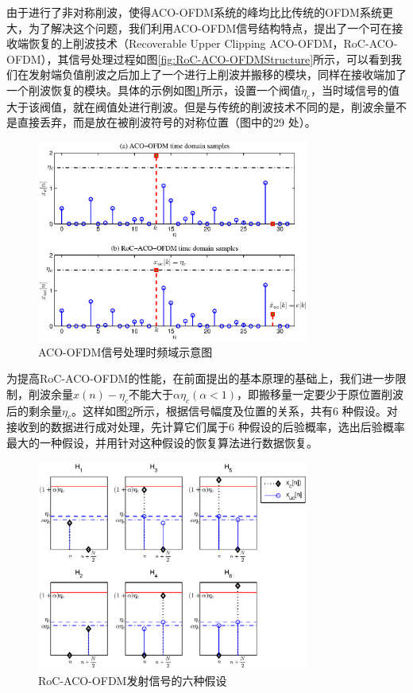 由于进行了非对称削波，使得ACO-OFDM系统的峰均比比传统的OFDM系统更大，为了解决这个问题，我们利用ACO-OFDM信号结构特点，提出了一个可在接收端恢复的上削波技术（Recoverable Upper Clipping ACO-OFDM，RoC-ACO-OFDM）\cite{xu2014aco}，其信号处理过程如图\ref{fig:RoC-ACO-OFDMStructure}所示，可以看到我们在发射端负值削波之后加上了一个进行上削波并搬移的模块，同样在接收端加了一个削波恢复的模块。具体的示例如图\ref{fig:SCH_data}所示，设置一个阀值$\eta_c$，当时域信号的值大于该阀值，就在阀值处进行削波。但是与传统的削波技术不同的是，削波余量不是直接丢弃，而是放在被削波符号的对称位置（图中的29 处）。
\begin{figure}[htbp]
    \centering
    \includegraphics[width=0.8\textwidth]{figures/chapter-2/SCH_data.eps}
    \caption{ACO-OFDM信号处理时频域示意图}
    \label{fig:SCH_data}
\end{figure}
为提高RoC-ACO-OFDM的性能，在前面提出的基本原理的基础上，我们进一步限制，削波余量$x(n)-\eta_c$不能大于$\alpha \eta_c(\alpha<1)$，即搬移量一定要少于原位置削波后的剩余量$\eta_c$。这样如图\ref{fig:HypothesisSketch}所示，根据信号幅度及位置的关系，共有6 种假设。对接收到的数据进行成对处理，先计算它们属于6 种假设的后验概率，选出后验概率最大的一种假设，并用针对这种假设的恢复算法进行数据恢复。
\begin{figure}[htbp]
    \centering
    \includegraphics[width=0.8\textwidth]{figures/chapter-2/HypothesisSketch.eps}
    \caption{RoC-ACO-OFDM发射信号的六种假设}
    \label{fig:HypothesisSketch}
\end{figure}

